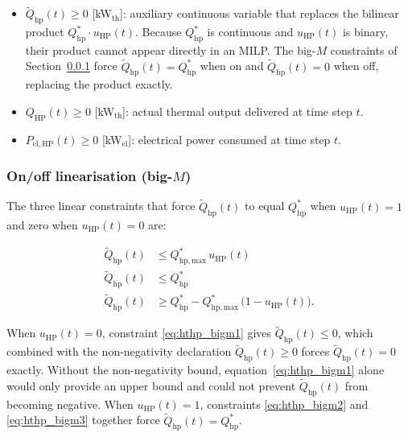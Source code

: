 \documentclass[11pt,a4paper]{report}
\begin{document}
\begin{itemize}
    \item $\tilde{Q}_\mathrm{hp}(t) \geq 0$ [kW$_\mathrm{th}$]: auxiliary continuous
          variable that replaces the bilinear product
          $Q_\mathrm{hp}^{*}\cdot u_\mathrm{HP}(t)$.
          Because $Q_\mathrm{hp}^{*}$ is continuous and $u_\mathrm{HP}(t)$ is binary,
          their product cannot appear directly in an MILP.
          The big-$M$ constraints of Section~\ref{sub:hthp_bigm} force
          $\tilde{Q}_\mathrm{hp}(t) = Q_\mathrm{hp}^{*}$ when on and
          $\tilde{Q}_\mathrm{hp}(t) = 0$ when off, replacing the product exactly.

    \item $Q_\mathrm{HP}(t) \geq 0$ [kW$_\mathrm{th}$]: actual thermal output
          delivered at time step $t$.

    \item $P_\mathrm{el,HP}(t) \geq 0$ [kW$_\mathrm{el}$]: electrical power consumed
          at time step $t$.

\end{itemize}

\subsubsection{On/off linearisation (big-$M$)}
\label{sub:hthp_bigm}

The three linear constraints that force $\tilde{Q}_\mathrm{hp}(t)$ to equal
$Q_\mathrm{hp}^{*}$ when $u_\mathrm{HP}(t)=1$ and zero when $u_\mathrm{HP}(t)=0$
are:

\begin{align}
    \tilde{Q}_\mathrm{hp}(t) &\leq Q_\mathrm{hp,max}^{*}\, u_\mathrm{HP}(t)
        \label{eq:hthp_bigm1} \\
    \tilde{Q}_\mathrm{hp}(t) &\leq Q_\mathrm{hp}^{*}
        \label{eq:hthp_bigm2} \\
    \tilde{Q}_\mathrm{hp}(t) &\geq Q_\mathrm{hp}^{*} - Q_\mathrm{hp,max}^{*}\,
        \bigl(1 - u_\mathrm{HP}(t)\bigr).
        \label{eq:hthp_bigm3}
\end{align}

\noindent When $u_\mathrm{HP}(t)=0$, constraint \eqref{eq:hthp_bigm1} gives
$\tilde{Q}_\mathrm{hp}(t) \leq 0$, which combined with the non-negativity declaration
$\tilde{Q}_\mathrm{hp}(t) \geq 0$ forces $\tilde{Q}_\mathrm{hp}(t)=0$ exactly.
Without the non-negativity bound, equation~\eqref{eq:hthp_bigm1} alone would only
provide an upper bound and could not prevent $\tilde{Q}_\mathrm{hp}(t)$ from becoming
negative.
When $u_\mathrm{HP}(t)=1$, constraints \eqref{eq:hthp_bigm2} and \eqref{eq:hthp_bigm3}
together force $\tilde{Q}_\mathrm{hp}(t)=Q_\mathrm{hp}^{*}$.
\end{document}
